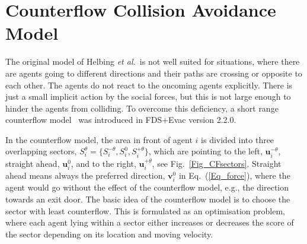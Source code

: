 \documentclass[12pt,a4paper,final,twoside]{stylevk}
\begin{document}
\section{Counterflow Collision Avoidance Model}\label{Sec_CF_Model}

\noindent The original model of Helbing \emph{et al.}\ is not well
suited for situations, where there are agents going to different
directions and their paths are crossing or opposite to each other.
The agents do not react to the oncoming agents explicitly.  There is
just a small implicit action by the social forces, but this is not
large enough to hinder the agents from colliding.  To overcome this
deficiency, a short range counterflow model~\cite{Heliovaara12} was
introduced in FDS+Evac version 2.2.0.


In the counterflow model, the area in front of agent $i$ is divided
into three overlapping sectors, $S^{\theta}_i = \lbrace S^{-\theta}_i
, S^{0}_i , S^{+\theta}_i \rbrace$, which are pointing to the left,
$\mathbf{u}^{-\theta}_i$, straight ahead, $\mathbf{u}^{0}_i$, and to
the right, $\mathbf{u}^{+\theta}_i$, see
Fig.~\ref{Fig_CFsectors}.  Straight ahead means always the
preferred direction, $\mathbf{v}_i^0$ in Eq.~(\ref{Eq_force}), where
the agent would go without the effect of the counterflow model, e.g.,
the direction towards an exit door.  The basic idea of the counterflow
model is to choose the sector with least counterflow.  This is
formulated as an optimisation problem, where each agent lying within a
sector either increases or decreases the score of the sector depending
on its location and moving velocity.
\end{document}
